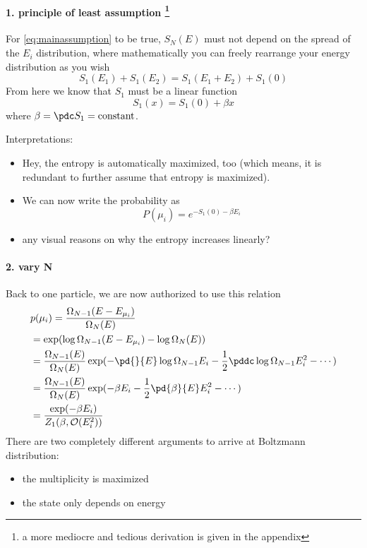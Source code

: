             \paragraph{1. principle of least assumption
            \footnote{a more mediocre and tedious derivation is given in the appendix}}
            For \eqref{eq:mainassumption} to be true,
            $S_N(E)$ must not depend on the spread of the $E_i$ distribution,
            where mathematically you can freely rearrange your energy distribution as you wish
            \[S_1(E_1) + S_1(E_2) = S_1(E_1+E_2) + S_1(0) \]
            From here we know that $S_1$ must be a linear function
            \[ S_1(x) = S_1(0) + \beta x\]
            where $\beta = \pdc S_1 = \mathrm{constant}$.


            Interpretations:
            \begin{itemize}
                \item Hey, the entropy is automatically maximized, too
                    (which means, it is redundant
                    to further assume that entropy is maximized).\\
                \item We can now write the probability as
                    \[ P(\mu_i) = e^{-S_1(0) -\beta E_i} \]
                \item any visual reasons on why the entropy increases linearly?
            \end{itemize}


            \paragraph{2. vary N}
            Back to one particle, we are now authorized to use this relation
            \begin{align*}
                &p(\mu_i) = \frac{\Omega_{N -1}(E-E_{\mu_i})}{\Omega_N(E)} \\
                &= \exp(\log\Omega_{N-1}(E-E_{\mu_i}) - \log \Omega_N(E))\\
                & = \frac{\Omega_{N-1}( E )}{\Omega_N(E)}
                    \exp( -\pd{}{E}\log \Omega_{N-1}E_i
                          - \frac12\pddc \log\Omega_{N-1}E_i^2
                          - \cdots
                          )\\
                & = \frac{\Omega_{N-1}( E )}{\Omega_N(E)}
                    \exp(-\beta E_i
                         -\frac12 \pd{\beta}{E} E_i^2
                         - \cdots  )\\
                & = \frac{\exp(-\beta E_i)}{Z_1(\beta,\mathcal{O}(E_i^2))}\\ 
            \end{align*}
            There are two completely different arguments
            to arrive at Boltzmann distribution:
            \begin{itemize}
                \item the multiplicity is maximized
                \item the state only depends on energy
            \end{itemize}

